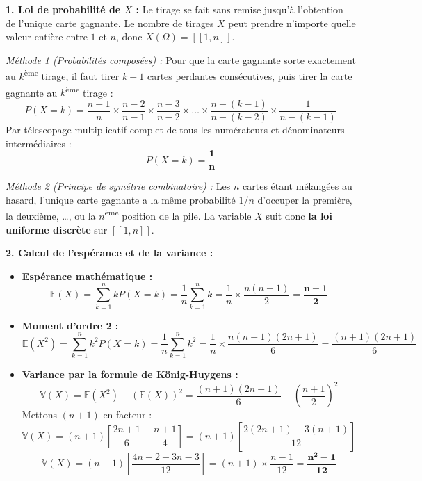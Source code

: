 \documentclass[11pt,a4paper]{article}
\newcommand{\E}{\mathbb{E}}
\newcommand{\V}{\mathbb{V}}
\begin{document}
\begin{correctionbox}
\textbf{1. Loi de probabilité de $X$ :}
Le tirage se fait sans remise jusqu'à l'obtention de l'unique carte gagnante. Le nombre de tirages $X$ peut prendre n'importe quelle valeur entière entre $1$ et $n$, donc $X(\Omega) = [\![1, n]\!]$.

\emph{Méthode 1 (Probabilités composées) :}
Pour que la carte gagnante sorte exactement au $k$\textsuperscript{ème} tirage, il faut tirer $k-1$ cartes perdantes consécutives, puis tirer la carte gagnante au $k$\textsuperscript{ème} tirage :
\[
P(X = k) = \frac{n-1}{n} \times \frac{n-2}{n-1} \times \frac{n-3}{n-2} \times \dots \times \frac{n-(k-1)}{n-(k-2)} \times \frac{1}{n-(k-1)}
\]
Par télescopage multiplicatif complet de tous les numérateurs et dénominateurs intermédiaires :
\[
P(X = k) = \mathbf{\frac{1}{n}}
\]

\emph{Méthode 2 (Principe de symétrie combinatoire) :}
Les $n$ cartes étant mélangées au hasard, l'unique carte gagnante a la même probabilité $1/n$ d'occuper la première, la deuxième, \dots, ou la $n$\textsuperscript{ème} position de la pile.
La variable $X$ suit donc \textbf{la loi uniforme discrète} sur $[\![1, n]\!]$.

\textbf{2. Calcul de l'espérance et de la variance :}
\begin{itemize}[label=$\bullet$]
    \item \textbf{Espérance mathématique :}
    \[
    \E(X) = \sum_{k=1}^n k P(X = k) = \frac{1}{n} \sum_{k=1}^n k = \frac{1}{n} \times \frac{n(n+1)}{2} = \mathbf{\frac{n+1}{2}}
    \]
    \item \textbf{Moment d'ordre 2 :}
    \[
    \E(X^2) = \sum_{k=1}^n k^2 P(X = k) = \frac{1}{n} \sum_{k=1}^n k^2 = \frac{1}{n} \times \frac{n(n+1)(2n+1)}{6} = \frac{(n+1)(2n+1)}{6}
    \]
    \item \textbf{Variance par la formule de König-Huygens :}
    \[
    \V(X) = \E(X^2) - (\E(X))^2 = \frac{(n+1)(2n+1)}{6} - \left(\frac{n+1}{2}\right)^2
    \]
    Mettons $(n+1)$ en facteur :
    \[
    \V(X) = (n+1) \left[ \frac{2n+1}{6} - \frac{n+1}{4} \right] = (n+1) \left[ \frac{2(2n+1) - 3(n+1)}{12} \right]
    \]
    \[
    \V(X) = (n+1) \left[ \frac{4n + 2 - 3n - 3}{12} \right] = (n+1) \times \frac{n - 1}{12} = \mathbf{\frac{n^2 - 1}{12}}
    \]
\end{itemize}
\end{correctionbox}

\vspace{0.3cm}
\end{document}
